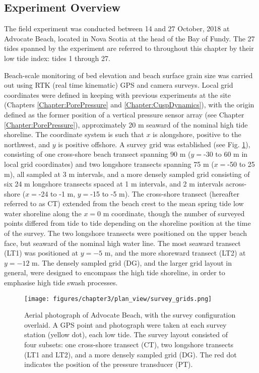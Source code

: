 \subsection{Experiment Overview}\label{subsec:ch3_experiment_overview}

The field experiment was conducted between 14 and 27 October, 2018 at Advocate Beach, located in Nova Scotia at the head of the Bay of Fundy. The 27 tides spanned by the experiment are referred to throughout this chapter by their low tide index: tides 1 through 27. %

Beach-scale monitoring of bed elevation and beach surface grain size was carried out using RTK (real time kinematic) GPS and camera surveys. Local grid coordinates were defined in keeping with previous experiments at the site (Chapters \ref{Chapter:PorePressure} and \ref{Chapter:CuspDynamics}), with the origin defined as the former position of a vertical pressure sensor array (see Chapter \ref{Chapter:PorePressure}), approximately 20 m seaward of the nominal high tide shoreline. The coordinate system is such that $x$ is alongshore, positive to the northwest, and $y$ is positive offshore. A survey grid was established (see Fig. \ref{fig:survey_grids}), consisting of one cross-shore beach transect spanning 90 m ($y=$-30 to 60 m in local grid coordinates) and two longshore transects spanning 75 m ($x=$-50 to 25 m), all sampled at 3 m intervals, and a more densely sampled grid consisting of six 24 m longshore transects spaced at 1 m intervals, and 2 m intervals across-shore ($x=$-24 to -1 m, $y=$-15 to -5 m). The cross-shore transect (hereafter referred to as CT) extended from the beach crest to the mean spring tide low water shoreline along the $x=0$ m coordinate, though the number of surveyed points differed from tide to tide depending on the shoreline position at the time of the survey. The two longshore transects were positioned on the upper beach face, but seaward of the nominal high water line. The most seaward transect (LT1) was positioned at $y=-5$ m, and the more shoreward transect (LT2) at $y=-12$ m. The densely sampled grid (DG), and the larger grid layout in general, were designed to encompass the high tide shoreline, in order to emphasise high tide swash processes. 

\begin{figure}[tbp] %
  	\texttt{[image: figures/chapter3/plan\_view/survey\_grids.png]}
 	\caption[Advocate Beach aerial photograph and survey grid configuration]{Aerial photograph of Advocate Beach, with the survey configuration overlaid. A GPS point and photograph were taken at each survey station (yellow dot), each low tide. The survey layout consisted of four subsets: one cross-shore transect (CT), two longshore transects (LT1 and LT2), and a more densely sampled grid (DG). The red dot indicates the position of the pressure transducer (PT). \label{fig:survey_grids}}
\end{figure}

